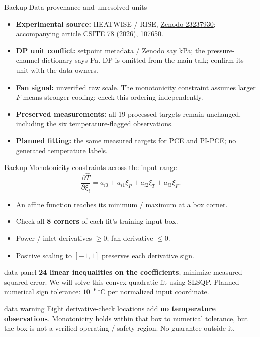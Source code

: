 \begin{frame}{Backup\enspace|\enspace Data provenance and unresolved units}
  \small
  \begin{itemize}
    \item \textbf{Experimental source:} HEATWISE / RISE,
      \href{https://doi.org/10.5281/zenodo.23237930}{Zenodo 23237930};
      accompanying article \href{https://doi.org/10.1016/j.csite.2026.107650}{CSITE 78 (2026), 107650}.
    \item \textbf{DP unit conflict:} setpoint metadata / Zenodo say kPa;
      the pressure-channel dictionary says Pa. DP is omitted from the main talk;
      confirm its unit with the data owners.
    \item \textbf{Fan signal:} unverified raw scale. The monotonicity constraint assumes
      larger $F$ means stronger cooling; check this ordering independently.
    \item \textbf{Preserved measurements:} all 19 processed targets remain unchanged,
      including the six temperature-flagged observations.
    \item \textbf{Planned fitting:} the same measured targets for PCE and PI-PCE;
      no generated temperature labels.
  \end{itemize}
\end{frame}

\begin{frame}{Backup\enspace|\enspace Monotonicity constraints across the input range}
  \small
  \[
    \frac{\partial\widehat T}{\partial \xi_i}
      =a_{i0}+a_{i1}\xi_P+a_{i2}\xi_T+a_{i3}\xi_F.
  \]
  \begin{itemize}
    \item An affine function reaches its minimum / maximum at a box corner.
    \item Check all \textbf{8 corners} of each fit's training-input box.
    \item Power / inlet derivatives $\geq0$; fan derivative $\leq0$.
    \item Positive scaling to $[-1,1]$ preserves each derivative sign.
  \end{itemize}
  \medskip
  \begin{beamercolorbox}[sep=2mm,wd=\textwidth]{data panel}
    \textbf{24 linear inequalities on the coefficients}; minimize measured squared error.
    We will solve this convex quadratic fit using SLSQP. Planned numerical sign tolerance:
    $10^{-6}\,{}^\circ$C per normalized input coordinate.
  \end{beamercolorbox}
  \smallskip
  \begin{beamercolorbox}[sep=1.5mm,wd=\textwidth]{data warning}
    Eight derivative-check locations add \textbf{no temperature observations}.
    Monotonicity holds within that box to numerical tolerance, but the box is not
    a verified operating / safety region. No guarantee outside it.
  \end{beamercolorbox}
\end{frame}

